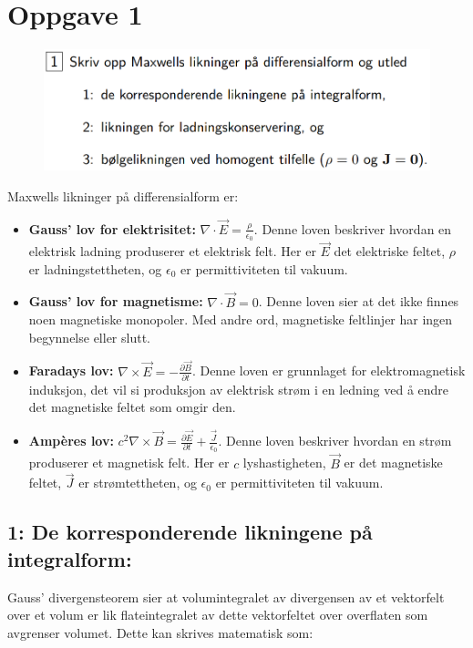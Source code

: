\section{Oppgave 1}
\begin{figure}[H]
    \centering
    \includegraphics[width=0.7 \textwidth]{./01.png}
    \caption{}
    \label{fig:01}
\end{figure}


Maxwells likninger på differensialform er:

\begin{itemize}
    \item \textbf{Gauss' lov for elektrisitet:} $\nabla \cdot \vec{E} = \frac{\rho}{\epsilon_0}$. Denne loven beskriver hvordan en elektrisk ladning produserer et elektrisk felt. Her er $\vec{E}$ det elektriske feltet, $\rho$ er ladningstettheten, og $\epsilon_0$ er permittiviteten til vakuum.
    \item \textbf{Gauss' lov for magnetisme:} $\nabla \cdot \vec{B} = 0$. Denne loven sier at det ikke finnes noen magnetiske monopoler. Med andre ord, magnetiske feltlinjer har ingen begynnelse eller slutt.
    \item \textbf{Faradays lov:} $\nabla \times \vec{E} = -\frac{\partial \vec{B}}{\partial t}$. Denne loven er grunnlaget for elektromagnetisk induksjon, det vil si produksjon av elektrisk strøm i en ledning ved å endre det magnetiske feltet som omgir den.
    \item \textbf{Ampères lov:} $c^2\nabla \times \vec{B} =\frac{\partial \vec{E}}{\partial t} + \frac{\vec{J}}{\epsilon_0}$. Denne loven beskriver hvordan en strøm produserer et magnetisk felt. Her er $c$ lyshastigheten, $\vec{B}$ er det magnetiske feltet, $\vec{J}$ er strømtettheten, og $\epsilon_0$ er permittiviteten til vakuum.
\end{itemize}


\subsection*{1: De korresponderende likningene på integralform:}

Gauss' divergensteorem sier at volumintegralet av divergensen av et vektorfelt over et volum er lik flateintegralet av dette vektorfeltet over overflaten som avgrenser volumet. Dette kan skrives matematisk som:

